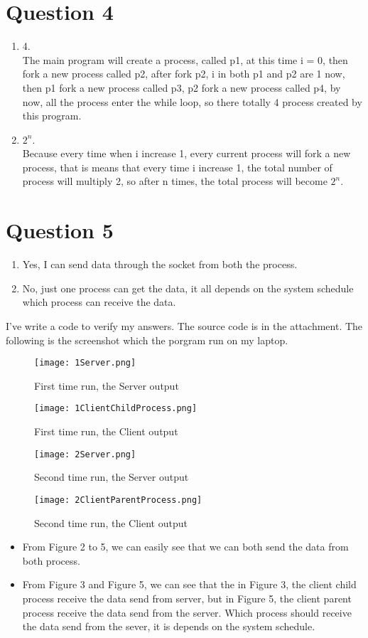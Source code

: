 \documentclass[a4paper,12pt]{article}
\begin{document}
\section*{Question 4}
\begin{enumerate}
\item 4.\\The main program will create a process, called p1, at this time i = 0, then fork a new process called p2, after fork p2, i in both p1 and p2 are 1 now, then p1 fork a new process called p3, p2 fork a new process called p4, by now, all the process enter the while loop, so there totally 4 process created by this program.
\item $2^n$.\\ Because every time when i increase 1, every current process will fork a new process, that is means that every time i increase 1, the total number of process will multiply 2, so after n times, the total process will become $2^n$.
\end{enumerate}
\section*{Question 5}
\begin{enumerate}
\item Yes, I can send data through the socket from both the process.
\item No, just one process can get the data, it all depends on the system schedule which process can receive the data.
\end{enumerate}
I've write a code to verify my answers.
The source code is in the attachment.
The following is the screenshot which the porgram run on my laptop.
\newpage
\begin{figure}[!htbp]
\texttt{[image: 1Server.png]}
\caption{First time run, the Server output}
\end{figure} 
\begin{figure}[!htbp]
\texttt{[image: 1ClientChildProcess.png]}
\caption{First time run, the Client output}
\end{figure} 
\begin{figure}[!htbp]
\texttt{[image: 2Server.png]}
\caption{Second time run, the Server output}
\end{figure} 
\begin{figure}[!htbp]
\texttt{[image: 2ClientParentProcess.png]}
\caption{Second time run, the Client output}
\end{figure} 
\begin{itemize}
\item From Figure 2 to 5, we can easily see that we can both send the data from both process.\\
\item From Figure 3 and Figure 5, we can see that the in Figure 3, the client child process receive the data send from server, but in Figure 5, the client parent process receive the data send from the server. Which process should receive the data send from the sever, it is depends on the system schedule.
\end{itemize}
\end{document}
